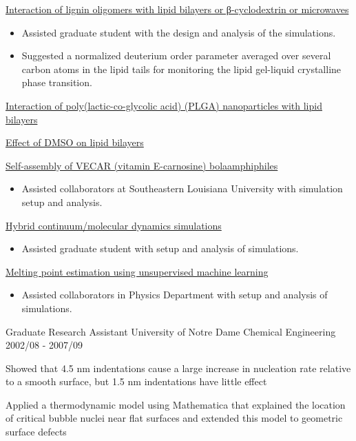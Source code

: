 \begin{cventries}
{\begin{cvitems}
\begin{itemize}
            \end{itemize}
        \item {\underline{Interaction of lignin oligomers with lipid bilayers or β-cyclodextrin or microwaves}}
            \begin{itemize}
            \item {Assisted graduate student with the design and analysis of the simulations.}
            \item {Suggested a normalized deuterium order parameter averaged over several carbon atoms in the lipid tails for monitoring the lipid gel-liquid crystalline phase transition.}
            \end{itemize}            
        \item {\underline{Interaction of poly(lactic-co-glycolic acid) (PLGA) nanoparticles with lipid bilayers}}
        \item {\underline{Effect of DMSO on lipid bilayers}}
        \item {\underline{Self-assembly of VECAR (vitamin E-carnosine) bolaamphiphiles}}
            \begin{itemize}
            \item {Assisted collaborators at Southeastern Louisiana University with simulation setup and analysis.}
            \end{itemize}
        \item {\underline{Hybrid continuum/molecular dynamics simulations}}
            \begin{itemize}
            \item {Assisted graduate student with setup and analysis of simulations.}
            \end{itemize}
        \item {\underline{Melting point estimation using unsupervised machine learning}}
            \begin{itemize}
            \item {Assisted collaborators in Physics Department with setup and analysis of simulations.}
            \end{itemize}      \end{cvitems}
    }
    
  \cventry
    {Graduate Research Assistant} %
    {University of Notre Dame} %
    {Chemical Engineering} %
    {2002/08 - 2007/09} %
    {
      \begin{cvitems} %
        \item {Showed that 4.5 nm indentations cause a large increase in nucleation rate relative to a smooth surface, but 1.5 nm indentations have little effect
        \item {Applied a thermodynamic model using Mathematica that explained the location of critical bubble nuclei near flat surfaces and extended this model to geometric surface defects}
}
      \end{cvitems}
    }
    

\end{cventries}
